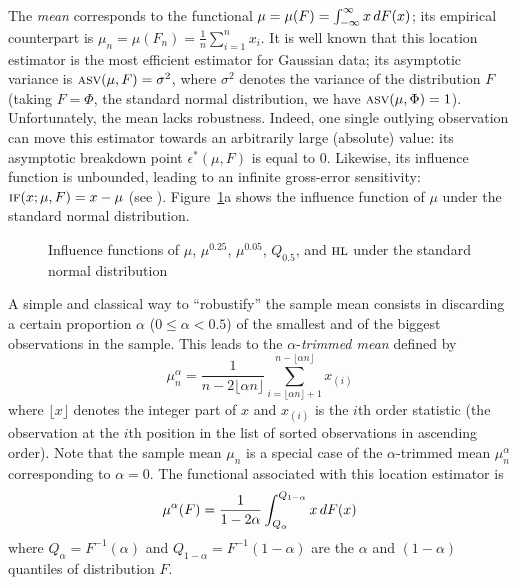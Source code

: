 The \emph{mean} corresponds to the functional $\mu = \mu(F) =
\int_{-\infty}^\infty x \mathop{}\!d F(x)$;                                              
its empirical counterpart is $\mu_n = \mu(F_n) = \frac{1}{n} \sum_{i=1}^n x_i$.
It is well known that this location estimator is the most efficient estimator
for Gaussian data; its asymptotic variance is $\stsc{ASV}(\mu, F) =
\sigma^2$, where $\sigma^2$ denotes the variance of the distribution $F$
(taking $F = \Phi$, the standard normal distribution, we have $\stsc{ASV}(\mu,
\Phi) = 1$). Unfortunately, the mean lacks robustness. Indeed, one single
outlying observation can move this estimator towards an arbitrarily large (absolute)
value: its asymptotic breakdown point $\epsilon^*(\mu, F)$ is equal to 0.
Likewise, its influence function is unbounded, leading to an infinite
gross-error sensitivity: $\stsc{IF}(x; \mu, F) = x - \mu$ (see \citealp[p.
25]{wilcox:2005}). Figure~\ref{fig:stat:IF_loc}a shows the influence function of
$\mu$ under the standard normal distribution.                                   


\begin{figure}[h!]
    \centering
    \caption{Influence functions of $\mu$, $\mu^{0.25}$, $\mu^{0.05}$, $Q_{0.5}$, and $\stsc{HL}$ under the standard normal distribution}
    \label{fig:stat:IF_loc}
\end{figure}

A simple and classical way to “robustify” the sample mean consists in
discarding a certain proportion $\alpha$ ($0\leq\alpha<0.5$) of the smallest
and of the biggest observations in the sample. This leads to the
$\alpha$-\emph{trimmed mean} defined by
\[
    \mu_n^\alpha =\frac{1}{n - 2\lfloor \alpha n \rfloor}
        \sum_{i = \lfloor \alpha n \rfloor + 1}^{n - \lfloor \alpha n \rfloor} x_{(i)}
\]
where $\lfloor x \rfloor$ denotes the integer part of $x$ and $x_{(i)}$ is the
$i$th order statistic (the observation at the $i$th position in the list of
sorted observations in ascending order). Note that the sample mean $\mu_n$ is
a special case of the $\alpha$-trimmed mean $\mu_n^\alpha$ corresponding
to $\alpha = 0$. The functional associated with this location estimator is
\[
    \mu^\alpha(F) = \frac{1}{1-2\alpha} \int_{Q_\alpha}^{Q_{1-\alpha}} x \mathop{}\!d F(x)
\]
where $Q_\alpha = F^{-1}(\alpha)$ and $Q_{1-\alpha} = F^{-1}(1-\alpha)$ are the
$\alpha$ and $(1-\alpha)$ quantiles of distribution $F$. 


